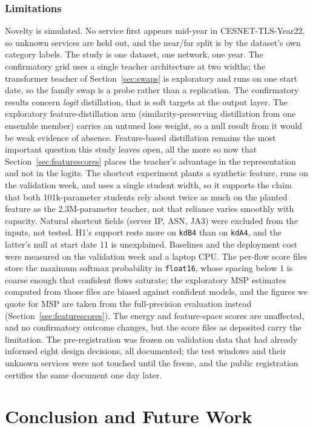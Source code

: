 \documentclass[journal]{IEEEtran}
\newcommand{\kd}[1]{\texttt{#1}}
\begin{document}
\subsubsection*{Limitations}
Novelty is simulated. No service first appears mid-year in CESNET-TLS-Year22, so unknown services are held out, and the near/far split is by the dataset's own category labels. The study is one dataset, one network, one year. The confirmatory grid uses a single teacher architecture at two widths; the transformer teacher of Section~\ref{sec:swaps} is exploratory and runs on one start date, so the family swap is a probe rather than a replication. The confirmatory results concern \emph{logit} distillation, that is soft targets at the output layer. The exploratory feature-distillation arm (similarity-preserving distillation from one ensemble member) carries an untuned loss weight, so a null result from it would be weak evidence of absence. Feature-based distillation remains the most important question this study leaves open, all the more so now that Section~\ref{sec:featurescores} places the teacher's advantage in the representation and not in the logits. The shortcut experiment plants a synthetic feature, runs on the validation week, and uses a single student width, so it supports the claim that both 101k-parameter students rely about twice as much on the planted feature as the 2.3M-parameter teacher, not that reliance varies smoothly with capacity. Natural shortcut fields (server IP, ASN, JA3) were excluded from the inputs, not tested. H1's support rests more on \kd{kdB4} than on \kd{kdA4}, and the latter's null at start date 11 is unexplained. Baselines and the deployment cost were measured on the validation week and a laptop CPU. The per-flow score files store the maximum softmax probability in \texttt{float16}, whose spacing below $1$ is coarse enough that confident flows saturate; the exploratory MSP estimates computed from those files are biased against confident models, and the figures we quote for MSP are taken from the full-precision evaluation instead (Section~\ref{sec:featurescores}). The energy and feature-space scores are unaffected, and no confirmatory outcome changes, but the score files as deposited carry the limitation. The pre-registration was frozen on validation data that had already informed eight design decisions, all documented; the test windows and their unknown services were not touched until the freeze, and the public registration certifies the same document one day later.

\section{Conclusion and Future Work}
\label{sec:conclusion}
\end{document}
